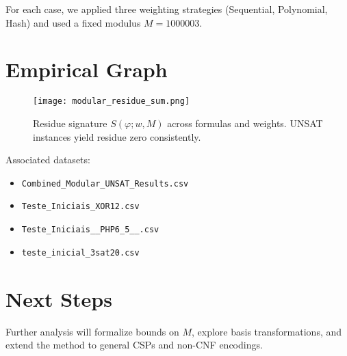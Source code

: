\documentclass{article}
\begin{document}
For each case, we applied three weighting strategies (Sequential, Polynomial, Hash) and used a fixed modulus $M = 1000003$.

\section{Empirical Graph}
\begin{figure}[h!]
\centering
\texttt{[image: modular\_residue\_sum.png]}
\caption{Residue signature $S(\varphi; w, M)$ across formulas and weights. UNSAT instances yield residue zero consistently.}
\end{figure}

\noindent Associated datasets:
\begin{itemize}
  \item \texttt{Combined\_Modular\_UNSAT\_Results.csv}
  \item \texttt{Teste\_Iniciais\_XOR12.csv}
  \item \texttt{Teste\_Iniciais\_\_PHP6\_5\_\_.csv}
  \item \texttt{teste\_inicial\_3sat20.csv}
\end{itemize}

\section{Next Steps}
Further analysis will formalize bounds on $M$, explore basis transformations, and extend the method to general CSPs and non-CNF encodings.
\end{document}
